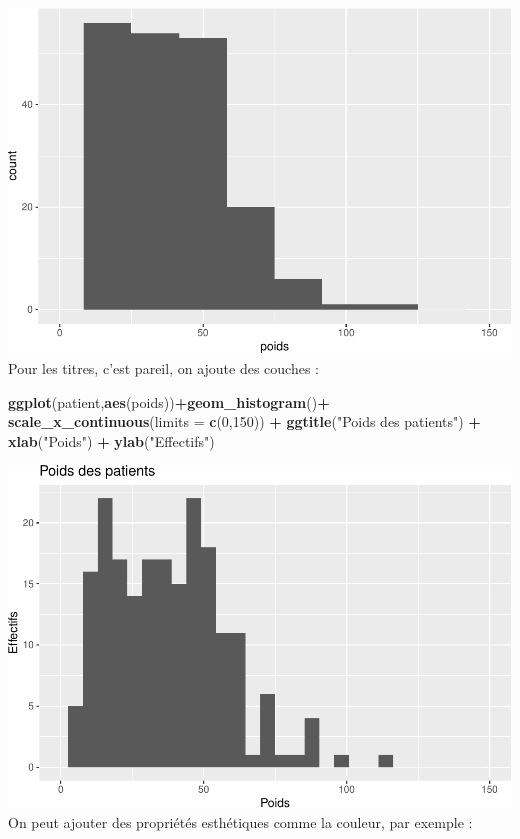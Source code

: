 \documentclass[
]{book}
\newenvironment{Shaded}{\begin{snugshade}}{\end{snugshade}}
\newcommand{\AttributeTok}[1]{\textcolor[rgb]{0.13,0.29,0.53}{#1}}
\newcommand{\DecValTok}[1]{\textcolor[rgb]{0.00,0.00,0.81}{#1}}
\newcommand{\FunctionTok}[1]{\textcolor[rgb]{0.13,0.29,0.53}{\textbf{#1}}}
\newcommand{\NormalTok}[1]{#1}
\newcommand{\SpecialCharTok}[1]{\textcolor[rgb]{0.81,0.36,0.00}{\textbf{#1}}}
\newcommand{\StringTok}[1]{\textcolor[rgb]{0.31,0.60,0.02}{#1}}
\begin{document}
\includegraphics{_main_files/figure-latex/ggplot5-1.pdf}
Pour les titres, c'est pareil, on ajoute des couches :

\begin{Shaded}
\begin{Highlighting}[]
\FunctionTok{ggplot}\NormalTok{(patient,}\FunctionTok{aes}\NormalTok{(poids))}\SpecialCharTok{+}\FunctionTok{geom\_histogram}\NormalTok{()}\SpecialCharTok{+}
  \FunctionTok{scale\_x\_continuous}\NormalTok{(}\AttributeTok{limits =} \FunctionTok{c}\NormalTok{(}\DecValTok{0}\NormalTok{,}\DecValTok{150}\NormalTok{)) }\SpecialCharTok{+} 
  \FunctionTok{ggtitle}\NormalTok{(}\StringTok{"Poids des patients"}\NormalTok{) }\SpecialCharTok{+} 
  \FunctionTok{xlab}\NormalTok{(}\StringTok{"Poids"}\NormalTok{) }\SpecialCharTok{+} 
  \FunctionTok{ylab}\NormalTok{(}\StringTok{"Effectifs"}\NormalTok{)}
\end{Highlighting}
\end{Shaded}

\includegraphics{_main_files/figure-latex/ggplot6-1.pdf}
On peut ajouter des propriétés esthétiques comme la couleur, par exemple :
\end{document}
